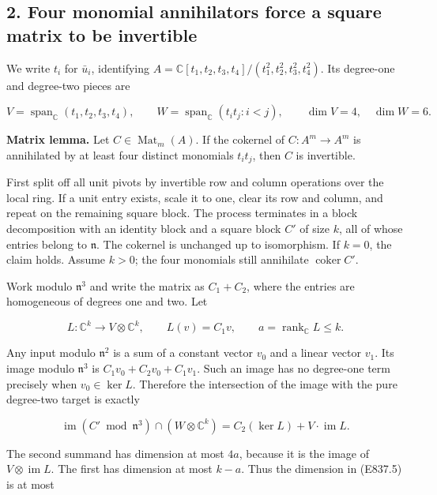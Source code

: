 \subsection{2. Four monomial annihilators force a square matrix to be
invertible}\label{SF-E837:four-monomial-annihilators-force-a-square-matrix-to-be-invertible}

We write \(t_i\) for \(\bar u_i\), identifying
\(A=\mathbb C[t_1,t_2,t_3,t_4]/(t_1^2,t_2^2,t_3^2,t_4^2)\). Its
degree-one and degree-two pieces are

\[
 V=\operatorname{span}_{\mathbb C}(t_1,t_2,t_3,t_4),
 \qquad W=\operatorname{span}_{\mathbb C}(t_it_j: i<j),
 \qquad \dim V=4,\quad\dim W=6.
 \tag{E837.3}
\]

\textbf{Matrix lemma.} Let \(C\in\operatorname{Mat}_m(A)\). If the
cokernel of \(C:A^m\to A^m\) is annihilated by at least four distinct
monomials \(t_it_j\), then \(C\) is invertible.

First split off all unit pivots by invertible row and column operations
over the local ring. If a unit entry exists, scale it to one, clear its
row and column, and repeat on the remaining square block. The process
terminates in a block decomposition with an identity block and a square
block \(C'\) of size \(k\), all of whose entries belong to
\(\mathfrak n\). The cokernel is unchanged up to isomorphism. If
\(k=0\), the claim holds. Assume \(k>0\); the four monomials still
annihilate \(\operatorname{coker}C'\).

Work modulo \(\mathfrak n^3\) and write the matrix as \(C_1+C_2\), where
the entries are homogeneous of degrees one and two. Let

\[
 L:\mathbb C^k\longrightarrow V\otimes\mathbb C^k,
 \qquad L(v)=C_1v,
 \qquad a=\operatorname{rank}_{\mathbb C}L\le k.
 \tag{E837.4}
\]

Any input modulo \(\mathfrak n^2\) is a sum of a constant vector \(v_0\)
and a linear vector \(v_1\). Its image modulo \(\mathfrak n^3\) is
\(C_1v_0+C_2v_0+C_1v_1\). Such an image has no degree-one term precisely
when \(v_0\in\ker L\). Therefore the intersection of the image with the
pure degree-two target is exactly

\[
 \operatorname{im}(C'\bmod\mathfrak n^3)
       \cap(W\otimes\mathbb C^k)
     = C_2(\ker L)+ V\cdot\operatorname{im}L.
 \tag{E837.5}
\]

The second summand has dimension at most \(4a\), because it is the image
of \(V\otimes\operatorname{im}L\). The first has dimension at most
\(k-a\). Thus the dimension in (E837.5) is at most

